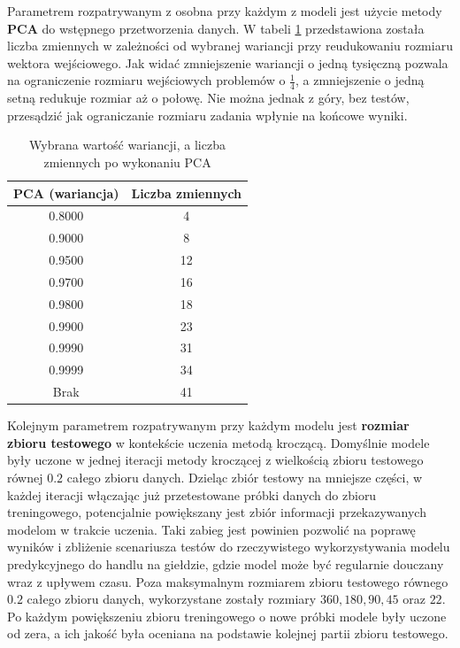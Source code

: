 \documentclass[a4paper, twoside, 11pt, openright]{article}
\begin{document}
\bigskip

Parametrem rozpatrywanym z osobna przy każdym z modeli jest użycie metody \textbf{PCA} do wstępnego przetworzenia danych. W tabeli \ref{tab:pca_component_number} przedstawiona została liczba zmiennych w zależności od wybranej wariancji przy reudukowaniu rozmiaru wektora wejściowego. Jak widać zmniejszenie wariancji o jedną tysięczną pozwala na ograniczenie rozmiaru wejściowych problemów o $\frac{1}{4}$, a zmniejszenie o jedną setną redukuje rozmiar aż o połowę. Nie można jednak z góry, bez testów, przesądzić jak ograniczanie rozmiaru zadania wpłynie na końcowe wyniki. 


\begin{table}[H]
    \centering
    \begin{tabular}{|c|c|}
    \hline
        \textbf{PCA (wariancja)} & \textbf{Liczba zmiennych} \\ \hline
        0.8000 & 4 \\ \hline 
        0.9000 & 8 \\ \hline 
        0.9500 & 12 \\ \hline 
        0.9700 & 16 \\ \hline 
        0.9800 & 18 \\ \hline 
        0.9900 & 23 \\ \hline
        0.9990 & 31 \\ \hline 
        0.9999 & 34 \\ \hline 
        Brak & 41 \\ \hline 
    \end{tabular}
    \caption{Wybrana wartość wariancji, a liczba zmiennych po wykonaniu PCA}
    \label{tab:pca_component_number}
\end{table}

\bigskip

Kolejnym parametrem rozpatrywanym przy każdym modelu jest \textbf{rozmiar zbioru testowego} w kontekście uczenia metodą kroczącą. Domyślnie modele były uczone w jednej iteracji metody kroczącej z wielkością zbioru testowego równej $0.2$ całego zbioru danych. Dzieląc zbiór testowy na mniejsze części, w każdej iteracji włączając już przetestowane próbki danych do zbioru treningowego, potencjalnie powiększany jest zbiór informacji przekazywanych modelom w trakcie uczenia. Taki zabieg jest powinien pozwolić na poprawę wyników i zbliżenie scenariusza testów do rzeczywistego wykorzystywania modelu predykcyjnego do handlu na giełdzie, gdzie model może być regularnie douczany wraz z upływem czasu. Poza maksymalnym rozmiarem zbioru testowego równego $0.2$ całego zbioru danych, wykorzystane zostały rozmiary $360, 180, 90, 45$ oraz $22$. Po każdym powiększeniu zbioru treningowego o nowe próbki modele były uczone od zera, a ich jakość była oceniana na podstawie kolejnej partii zbioru testowego.
\end{document}
